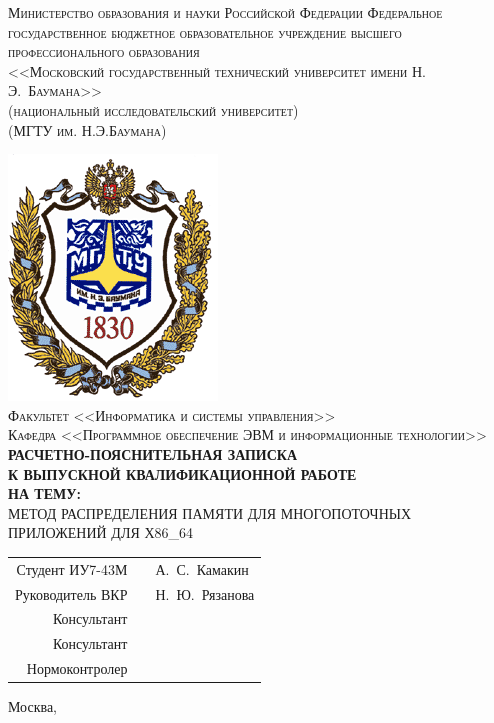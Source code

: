 \newcommand{\HRule}{\rule{\linewidth}{0.5mm}}
\fontsize{14}{14pt}\selectfont
\begin{center}

\textsc{
Министерство образования и науки Российской Федерации
Федеральное государственное бюджетное образовательное учреждение 
высшего профессионального образования\\
<<Московский государственный технический университет имени Н.\,Э.~Баумана>>\\
(национальный исследовательский университет)\\
(МГТУ им. Н.Э.Баумана)\\}

\includegraphics[scale=0.5]{images/bmstu-logo.png}\\

\textsc{Факультет <<Информатика и системы управления>>}\\
\textsc{Кафедра <<Программное обеспечение ЭВМ и информационные технологии>>}\\[1cm]

\textsc{\large \bfseries РАСЧЕТНО-ПОЯСНИТЕЛЬНАЯ ЗАПИСКА\\К ВЫПУСКНОЙ КВАЛИФИКАЦИОННОЙ РАБОТЕ\\НА ТЕМУ:}\\[1cm]

\textsc{\large  МЕТОД РАСПРЕДЕЛЕНИЯ ПАМЯТИ ДЛЯ МНОГОПОТОЧНЫХ ПРИЛОЖЕНИЙ ДЛЯ Х86\_64}

\vfill

\begin{flushright}
  \begin{tabular}{rll}
    Студент ИУ7-43М & \underline{\hspace{6cm}} & А.~С.~Камакин\\[0.5cm]
    Руководитель ВКР & \underline{\hspace{6cm}} & Н.~Ю.~Рязанова\\[0.5cm]
    Консультант & \underline{\hspace{6cm}} & \underline{\hspace{3cm}}\\[0.5cm]
    Консультант & \underline{\hspace{6cm}} & \underline{\hspace{3cm}}\\[0.5cm]
    Нормоконтролер & \underline{\hspace{6cm}} & \underline{\hspace{3cm}}\\[0.5cm]
  \end{tabular}
\end{flushright}

{\large Москва, \the\year}

\end{center}

\thispagestyle{empty}
